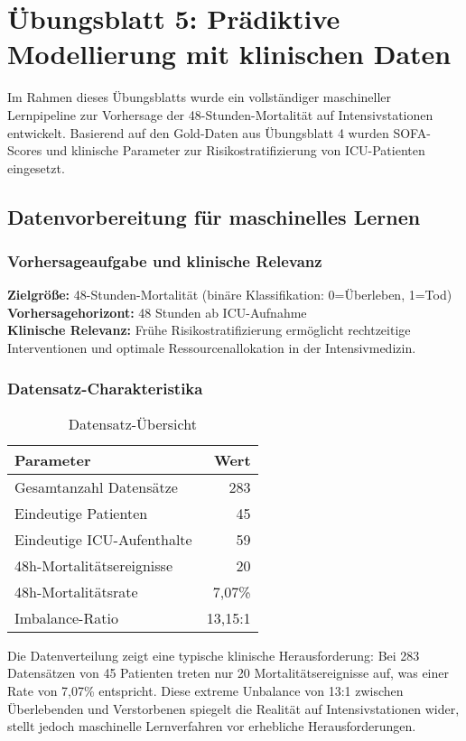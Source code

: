 \documentclass[12pt]{article}
\begin{document}
\section{Übungsblatt 5: Prädiktive Modellierung mit klinischen Daten}

Im Rahmen dieses Übungsblatts wurde ein vollständiger maschineller Lernpipeline zur Vorhersage der 48-Stunden-Mortalität auf Intensivstationen entwickelt. Basierend auf den Gold-Daten aus Übungsblatt 4 wurden SOFA-Scores und klinische Parameter zur Risikostratifizierung von ICU-Patienten eingesetzt.

\subsection{Datenvorbereitung für maschinelles Lernen}

\subsubsection{Vorhersageaufgabe und klinische Relevanz}
\textbf{Zielgröße:} 48-Stunden-Mortalität (binäre Klassifikation: 0=Überleben, 1=Tod)\\
\textbf{Vorhersagehorizont:} 48 Stunden ab ICU-Aufnahme\\
\textbf{Klinische Relevanz:} Frühe Risikostratifizierung ermöglicht rechtzeitige Interventionen und optimale Ressourcenallokation in der Intensivmedizin.

\subsubsection{Datensatz-Charakteristika}
\begin{table}[H]
\centering
\begin{tabular}{lr}
\toprule
\textbf{Parameter} & \textbf{Wert} \\
\midrule
Gesamtanzahl Datensätze & 283 \\
Eindeutige Patienten & 45 \\
Eindeutige ICU-Aufenthalte & 59 \\
48h-Mortalitätsereignisse & 20 \\
48h-Mortalitätsrate & 7,07\% \\
Imbalance-Ratio & 13,15:1 \\
\bottomrule
\end{tabular}
\caption{Datensatz-Übersicht}
\end{table}

Die Datenverteilung zeigt eine typische klinische Herausforderung: Bei 283 Datensätzen von 45 Patienten treten nur 20 Mortalitätsereignisse auf, was einer Rate von 7,07\% entspricht. Diese extreme Unbalance von 13:1 zwischen Überlebenden und Verstorbenen spiegelt die Realität auf Intensivstationen wider, stellt jedoch maschinelle Lernverfahren vor erhebliche Herausforderungen.
\end{document}
